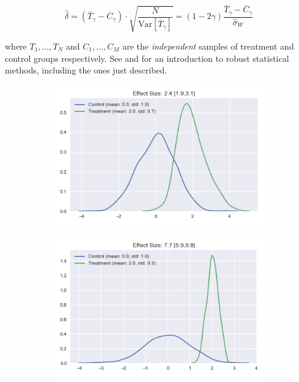\documentclass[a4paper]{book}
\begin{document}
\begin{equation}
\label{eq:effect_size}
\hat{\delta}=(\overline{T}_\gamma-\overline{C}_\gamma)\cdot\sqrt{\frac{N}{\text{Var}[\overline{T}_\gamma]}}
=(1-2\gamma)\frac{\overline{T}_\gamma-\overline{C}_\gamma}{\hat{\sigma}_W}
\end{equation}

\noindent where $T_1,\ldots,T_N$ and $C_1,\ldots,C_M$ are the \emph{independent} samples of treatment and control groups respectively. See  \cite{robust_stat} and \cite{modern_stat}for an introduction to robust statistical methods, including the ones just described.

\begin{figure}
    \centering
    \begin{subfigure}[t]{0.49\textwidth}
        \centering
        \includegraphics[width=\textwidth]{images/small_es}
        \label{fig:small_es}
    \end{subfigure}
    \hfill
    \begin{subfigure}[t]{0.49\textwidth}
        \centering
        \includegraphics[width=\textwidth]{images/large_es}

\end{subfigure}
\end{figure}
\end{document}
